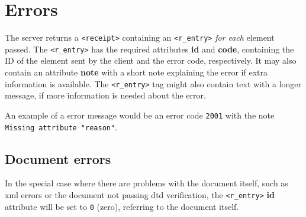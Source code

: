 \newpage
\section{Errors}
\label{sec:errors}

The server returns a \texttt{<receipt>} containing an \texttt{<r\_entry>}
\textit{for each} element passed. The \texttt{<r\_entry>} has the required
attributes \textbf{id} and \textbf{code}, containing the ID of the element sent
by the client and the error code, respectively. It may also contain an
attribute \textbf{note} with a short note explaining the error if extra
information is available. The \texttt{<r\_entry>} tag might also contain text
with a longer message, if more information is needed about the error. 

An example of a error message would be an error code \texttt{2001} with the
note \texttt{Missing attribute "reason"}.

\subsection{Document errors}

In the special case where there are problems with the document itself, such as
\gls{xml} errors or the document not passing \gls{dtd} verification, the
\texttt{<r\_entry>} \textbf{id} attribute will be set to \texttt{0} (zero),
referring to the document itself. 
